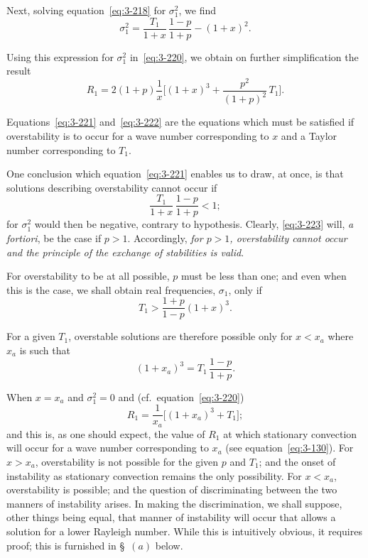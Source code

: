 Next, solving equation~\eqref{eq:3-218} for $\sigma_1^2$, we find
\begin{equation}\label{eq:3-221}
\sigma_1^2 = \frac{T_1}{1+x}\,\frac{1-p}{1+p} - (1+x)^2.
\end{equation}

Using this expression for $\sigma_1^2$ in~\eqref{eq:3-220}, we obtain on further simplification the result
\begin{equation}\label{eq:3-222}
R_1 = 2(1+p)\frac{1}{x}\bigg[(1+x)^3 + \frac{p^2}{(1+p)^2}\,T_1\bigg].
\end{equation}

Equations~\eqref{eq:3-221} and~\eqref{eq:3-222} are the equations which must be satisfied if overstability is to occur for a wave number corresponding to $x$ and a Taylor number corresponding to $T_1$.

One conclusion which equation~\eqref{eq:3-221} enables us to draw, at once, is that solutions describing overstability cannot occur if
\begin{equation}\label{eq:3-223}
\frac{T_1}{1+x}\,\frac{1-p}{1+p} < 1;
\end{equation}
for $\sigma_1^2$ would then be negative, contrary to hypothesis. Clearly, \eqref{eq:3-223} will, \emph{a fortiori}, be the case if $p > 1$. Accordingly, \emph{for $p > 1$, overstability cannot occur and the principle of the exchange of stabilities is valid}.

For overstability to be at all possible, $p$ must be less than one; and even when this is the case, we shall obtain real frequencies, $\sigma_1$, only if
\begin{equation}\label{eq:3-224}
T_1 > \frac{1+p}{1-p}(1+x)^3.
\end{equation}

For a given $T_1$, overstable solutions are therefore possible only for $x < x_a$ where $x_a$ is such that
\begin{equation}\label{eq:3-225}
(1+x_a)^3 = T_1\,\frac{1-p}{1+p}.
\end{equation}

When $x = x_a$ and $\sigma_1^2 = 0$ and (cf.\ equation~\eqref{eq:3-220})
\begin{equation}\label{eq:3-226}
R_1 = \frac{1}{x_a}\big[(1+x_a)^3 + T_1\big];
\end{equation}
and this is, as one should expect, the value of $R_1$ at which stationary convection will occur for a wave number corresponding to $x_a$ (see equation~\eqref{eq:3-130}). For $x > x_a$, overstability is not possible for the given $p$ and $T_1$; and the onset of instability as stationary convection remains the only possibility. For $x < x_a$, overstability is possible; and the question of discriminating between the two manners of instability arises. In making the discrimination, we shall suppose, other things being equal, that manner of instability will occur that allows a solution for a lower Rayleigh number. While this is intuitively obvious, it requires proof; this is furnished in \S~$(a)$ below.

